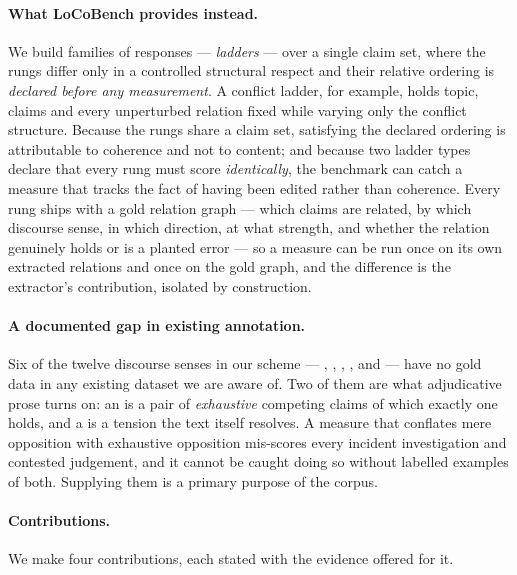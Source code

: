 \paragraph{What LoCoBench provides instead.} We build families of responses --- \emph{ladders} --- over
a single claim set, where the rungs differ only in a controlled structural respect and their relative
ordering is \emph{declared before any measurement}. A conflict ladder, for example, holds topic, claims and
every unperturbed relation fixed while varying only the conflict structure. Because the rungs share a
claim set, satisfying the declared ordering is attributable to coherence and not to content; and because
two ladder types declare that every rung must score \emph{identically}, the benchmark can catch a measure
that tracks the fact of having been edited rather than coherence. Every rung ships with a gold relation
graph --- which claims are related, by which discourse sense, in which direction, at what strength, and
whether the relation genuinely holds or is a planted error --- so a measure can be run once on its own
extracted relations and once on the gold graph, and the difference is the extractor's contribution,
isolated by construction.

\paragraph{A documented gap in existing annotation.} Six of the twelve discourse senses in our scheme ---
, , , ,  and
 --- have no gold data in any existing dataset we are aware of. Two of them are what
adjudicative prose turns on: an  is a pair of \emph{exhaustive} competing claims of which
exactly one holds, and a  is a tension the text itself resolves. A measure that conflates
mere opposition with exhaustive opposition mis-scores every incident investigation and contested
judgement, and it cannot be caught doing so without labelled examples of both. Supplying them is a primary
purpose of the corpus.

\paragraph{Contributions.} We make four contributions, each stated with the evidence offered for it.

